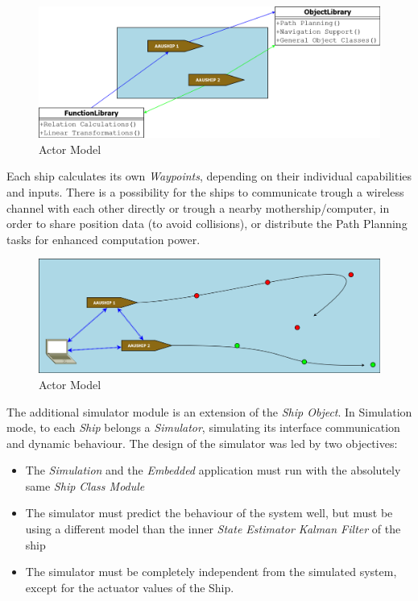 \begin{figure}[htbp]
\centering
\includegraphics[width = \textwidth]{img/HLIFigures/ActorModel/Actor-model1.png}
\caption{Actor Model}
\label{fig:actor_model1}
\end{figure}

Each ship calculates its own \emph{Waypoints}, depending on their individual capabilities and inputs.
There is a possibility for the ships to communicate trough a wireless channel with each other directly or trough a nearby mothership/computer, in order to share position data (to avoid collisions), or distribute the Path Planning tasks for enhanced computation power.

\begin{figure}[htbp]
\centering
\includegraphics[width = \textwidth]{img/HLIFigures/ActorModel/Actor-model2.png}
\caption{Actor Model}
\label{fig:actor_model2}
\end{figure}

The additional simulator module is an extension of the \emph{Ship Object}. In Simulation mode, to each \emph{Ship} belongs a \emph{Simulator}, simulating its interface communication and dynamic behaviour. The design of the simulator was led by two objectives:
\begin{itemize}
\item The \emph{Simulation} and the \emph{Embedded} application must run with the absolutely same \emph{Ship Class Module}
\item The simulator must predict the behaviour of the system well, but must be using a different model than the inner \emph{State Estimator Kalman Filter} of the ship
\item The simulator must be completely independent from the simulated system, except for the actuator values of the Ship.
\end{itemize}

